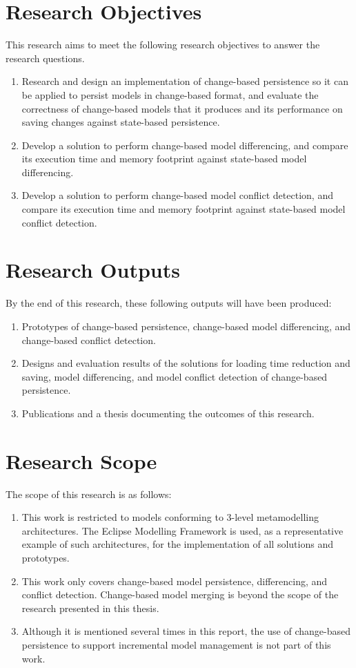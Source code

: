 \section{Research Objectives}
\label{sec:research_objectives}
This research aims to meet the following research objectives to answer the research questions.
\begin{enumerate}
\item Research and design an implementation of change-based persistence so it can be applied to persist models in change-based format, and evaluate the correctness of change-based models that it produces and its performance on saving changes against state-based persistence. 
\item Develop a solution to perform change-based model differencing, and compare its execution time and memory footprint against state-based model differencing.
\item Develop a solution to perform change-based model conflict detection, and compare its execution time and memory footprint against state-based model conflict detection.
\end{enumerate}

\section{Research Outputs}
\label{sec:research_outputs}
By the end of this research, these following outputs will have been produced:
\begin{enumerate}
\item Prototypes of change-based persistence, change-based model differencing, and change-based conflict detection. 
\item Designs and evaluation results of the solutions for loading time reduction and saving, model differencing, and model conflict detection of change-based persistence.
\item Publications and a thesis documenting the outcomes of this research.
\end{enumerate}

\section{Research Scope}
\label{sec:research_scope}
The scope of this research is as follows:
\begin{enumerate}
\item This work is restricted to models conforming to 3-level metamodelling architectures. The Eclipse Modelling Framework is used, as a representative example of such architectures, for the implementation of all solutions and prototypes.
\item This work only covers change-based model persistence, differencing, and conflict detection. Change-based model merging is beyond the scope of the research presented in this thesis.
\item Although it is mentioned several times in this report, the use of change-based persistence to support incremental model management is not part of this work. 
\end{enumerate}


